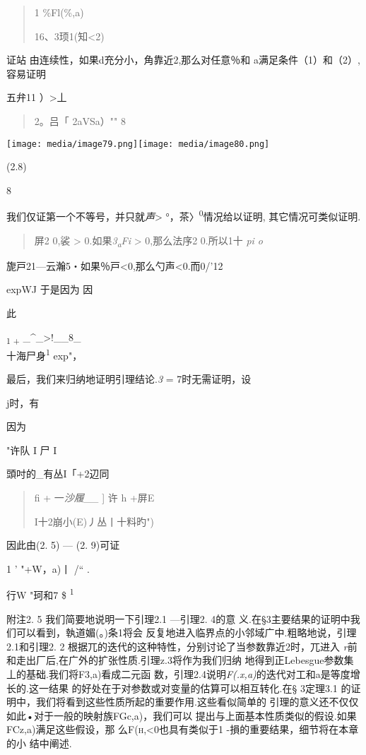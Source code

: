 \begin{quote}
1 {\textbar{}\%Fl(\%,a)\textbar{}}

16、\textbar{}3顼1(知\textless{}2)\textbar{}
\end{quote}

证站 由连续性，如果d充分小，角靠近2,那么对任意％和
a满足条件（1）和（2）,容易证明

五弁11 ）\textgreater{}丄

\begin{quote}
2。吕「 \textbar{}2aVSa）"" 8
\end{quote}

\texttt{[image: media/image79.png]}\texttt{[image: media/image80.png]}

(2.8)

8

我们仅证第一个不等号，并只就\emph{声}\textgreater{}
°，茶〉\textsuperscript{0}情况给以证明, 其它情况可类似证明.

\begin{quote}
屏2 0,裟 \textgreater{} 0.如果\emph{3\textsubscript{a}Fi} \textgreater{}
0,那么法序2 0.所以1十 \emph{pi o}
\end{quote}

旎戸21---云瀚5・如果％戸\textless{}0,那么勺声\textless{}0.而0/'12

expWJ 于是因为 因

此

\textsubscript{1 +} \_\^{}\_\textgreater{}!\_\_8\_\\
十海尸身\textsuperscript{1} exp"，

最后，我们来归纳地证明引理结论.\emph{3} = 7时无需证明，设

j时，有

因为

"许队 I 尸 I

頭吋的\_有丛I「+2辺同

\begin{quote}
fi + 一\emph{沙履\_\_} {]} \textbar{}许\textbar{} h +{屏E}

I十2崩小(E)丿\textbar{}丛\textbar{}丨十料旳")
\end{quote}

因此由(2. 5) --- (2. 9)可证

1 ' {"+W，a)丨} /`` .

行W "珂和7 \$ \textsuperscript{1}

附注2. 5 我们简要地说明一下引理2.1 ---引理2. 4的意
义.在§3主要结果的证明中我们可以看到，執道媚(。)条1将会
反复地进入临界点的小邻域广中.粗略地说，引理2.1和引理2. 2
根据兀的迭代的这种特性，分别讨论了当参数靠近2时，兀进入
\emph{r}前和走出厂后,在广外的扩张性质.引理z.3将作为我们归纳
地得到正Lebesgue参数集丄的基础.我们将F3,a)看成二元函
数，引理2.4说明\emph{F(.x,a)}的迭代对工和a是等度增长的.这一结果
的好处在于对参数或对变量的估算可以相互转化.在§ 3定理3.1
的证明中，我们将看到这些性质所起的重要作用.这些看似简单的
引理的意义还不仅仅如此•对于一般的映射族FGc,a)，我们可以
提出与上面基本性质类似的假设.如果FCz,a)满足这些假设，那
么\textsc{F(h,\textless{}0}也具有类似于1 -損的重要结果，细节将在本章的小
结中阐述.